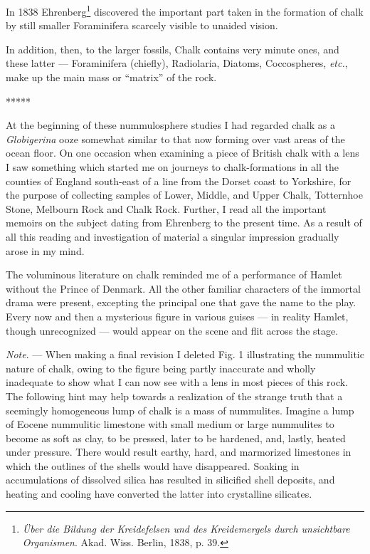 \documentclass[a4paper, 12pt, oneside, landscape]{article}
\begin{document}
In 1838 Ehrenberg\footnote{\emph{Über die Bildung der Kreidefelsen und des Kreidemergels durch unsichtbare Organismen}. Akad. Wiss. Berlin, 1838, p. 39.} discovered the important part taken in the formation of chalk by still smaller Foraminifera scarcely visible to unaided vision.

In addition, then, to the larger fossils, Chalk contains very minute ones, and these latter --- Foraminifera (chiefly), Radiolaria, Diatoms, Coccospheres, \emph{etc.}, make up the main mass or ``matrix'' of the rock.

\centerline{*\hspace{15mm}*\hspace{15mm}*\hspace{15mm}*\hspace{15mm}*}
\bigskip

At the beginning of these nummulosphere studies I had regarded chalk as a \emph{Globigerina} ooze somewhat similar to that now forming over vast areas of the ocean floor. On one occasion when examining a piece of British chalk with a lens I saw something which started me on journeys to chalk-formations in all the counties of England south-east of a line from the Dorset coast to Yorkshire, for the purpose of collecting samples of Lower, Middle, and Upper Chalk, Totternhoe Stone, Melbourn Rock and Chalk Rock. Further, I read all the important memoirs on the subject dating from Ehrenberg to the present time. As a result of all this reading and investigation of material a singular impression gradually arose in my mind.

The voluminous literature on chalk reminded me of a performance of Hamlet without the Prince of Denmark. All the other familiar characters of the immortal drama were present, excepting the principal one that gave the name to the play. Every now and then a mysterious figure in various guises --- in reality Hamlet, though unrecognized --- would appear on the scene and flit across the stage.

\emph{Note}. --- When making a final revision I deleted Fig. 1 illustrating the nummulitic nature of chalk, owing to the figure being partly inaccurate and wholly inadequate to show what I can now see with a lens in most pieces of this rock. The following hint may help towards a realization of the strange truth that a seemingly homogeneous lump of chalk is a mass of nummulites. Imagine a lump of Eocene nummulitic limestone with small medium or large nummulites to become as soft as clay, to be pressed, later to be hardened, and, lastly, heated under pressure. There would result earthy, hard, and marmorized limestones in which the outlines of the shells would have disappeared. Soaking in accumulations of dissolved silica has resulted in silicified shell deposits, and heating and cooling have converted the latter into crystalline silicates.
\end{document}
